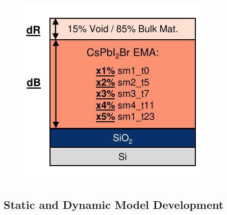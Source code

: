 \begin{figure}
  \centering
  \medskip
  \includegraphics[width=.45\textwidth]{chapters/ellipsometry/image/Dynamic_Model.pdf}
  \caption{}
  \label{fig:ellipsometry:dynamic_model}
\end{figure}



\subsection{Static and Dynamic Model Development}

